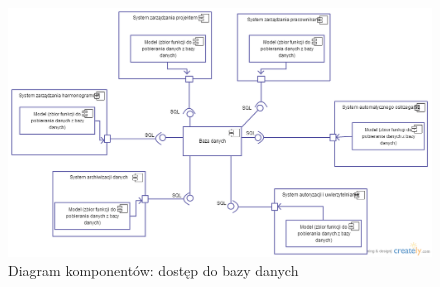 \begin{adjustwidth}{2em}{0pt}
\begin{figure}[H]
    \centering
    \includegraphics[scale=0.4]{diagramy/sekwencji_i_komponentow/diag_kom_dane_dostep.png}
    \caption{Diagram komponentów: dostęp do bazy danych}
    \label{fig:diag_kom_dane_dostep}
\end{figure} 

\end{adjustwidth}